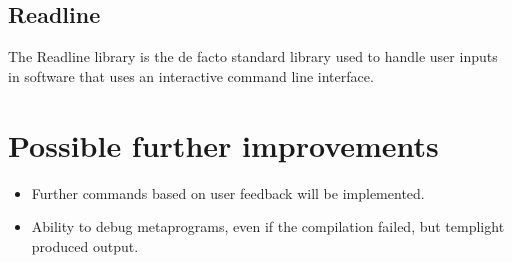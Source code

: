 \subsection{Readline\cite{readline}}

The Readline library is the de facto standard library used to handle user
inputs in software that uses an interactive command line interface.

\section{Possible further improvements}

\begin{itemize}
    \item
        Further commands based on user feedback will be implemented.
    \item
        Ability to debug metaprograms, even if the compilation failed, but
        templight produced output.
\end{itemize}

